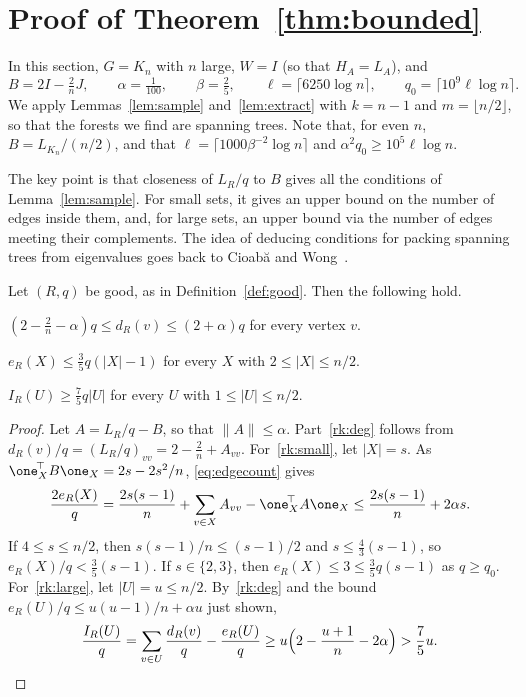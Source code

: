 \section{Proof of Theorem~\ref{thm:bounded}}\label{sec:thmA}
In this section, $G=K_n$ with $n$ large, $W=I$ (so that $H_A=L_A$), and
\[
B=2I-\tfrac2nJ,\qquad\alpha=\tfrac1{100},\qquad\beta=\tfrac25,\qquad\ell=\lceil6250\log n\rceil,\qquad q_0=\lceil10^9\ell\log n\rceil .
\]
We apply Lemmas~\ref{lem:sample} and~\ref{lem:extract} with $k=n-1$ and $m=\lfloor n/2\rfloor$, so that the forests we find are spanning trees.
Note that, for even $n$, $B=L_{K_n}/(n/2)$, and that $\ell=\lceil1000\beta^{-2}\log n\rceil$ and $\alpha^2q_0\ge10^5\ell\log n$.

The key point is that closeness of $L_R/q$ to $B$ gives all the conditions of Lemma~\ref{lem:sample}.
For small sets, it gives an upper bound on the number of edges inside them, and, for large sets, an upper bound via the number of edges meeting their complements.
The idea of deducing conditions for packing spanning trees from eigenvalues goes back to Cioab\u{a} and Wong~\cite{CW}.

\begin{lemma}\label{lem:ranks}
Let $(R,q)$ be good, as in Definition~\ref{def:good}. Then the following hold.
\begin{props}
\item $(2-\frac2n-\alpha)q\le d_R(v)\le(2+\alpha)q$ for every vertex $v$.\label{rk:deg}
\item $e_R(X)\le\frac35q(|X|-1)$ for every $X$ with $2\le|X|\le n/2$.\label{rk:small}
\item $I_R(U)\ge\frac75q|U|$ for every $U$ with $1\le|U|\le n/2$.\label{rk:large}
\end{props}
\end{lemma}
\begin{proof}
Let $A=L_R/q-B$, so that $\|A\|\le\alpha$. Part~\ref{rk:deg} follows from $d_R(v)/q=(L_R/q)_{vv}=2-\frac2n+A_{vv}$.
For~\ref{rk:small}, let $|X|=s$. As $\one_X^{\!\top}B\one_X=2s-2s^2/n$, \eqref{eq:edgecount} gives
\[
\frac{2e_R(X)}q=\frac{2s(s-1)}n+\sum_{v\in X}A_{vv}-\one_X^{\!\top}A\one_X\le\frac{2s(s-1)}n+2\alpha s .
\]
If $4\le s\le n/2$, then $s(s-1)/n\le(s-1)/2$ and $s\le\frac43(s-1)$, so $e_R(X)/q<\frac35(s-1)$. If $s\in\{2,3\}$, then $e_R(X)\le3\le\frac35q(s-1)$ as $q\ge q_0$.
For~\ref{rk:large}, let $|U|=u\le n/2$. By~\ref{rk:deg} and the bound $e_R(U)/q\le u(u-1)/n+\alpha u$ just shown,
\[
\frac{I_R(U)}q=\sum_{v\in U}\frac{d_R(v)}q-\frac{e_R(U)}q\ge u\Bigl(2-\frac{u+1}n-2\alpha\Bigr)>\frac75u . \qedhere
\]
\end{proof}

